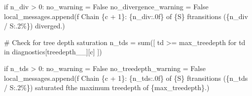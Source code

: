\documentclass[
  letterpaper,
  DIV=11,
  numbers=noendperiod]{scrartcl}
\newenvironment{Shaded}{\begin{snugshade}}{\end{snugshade}}
\newcommand{\BuiltInTok}[1]{\textcolor[rgb]{0.00,0.23,0.31}{#1}}
\newcommand{\CommentTok}[1]{\textcolor[rgb]{0.37,0.37,0.37}{#1}}
\newcommand{\ControlFlowTok}[1]{\textcolor[rgb]{0.00,0.23,0.31}{#1}}
\newcommand{\DecValTok}[1]{\textcolor[rgb]{0.68,0.00,0.00}{#1}}
\newcommand{\KeywordTok}[1]{\textcolor[rgb]{0.00,0.23,0.31}{#1}}
\newcommand{\NormalTok}[1]{\textcolor[rgb]{0.00,0.23,0.31}{#1}}
\newcommand{\OperatorTok}[1]{\textcolor[rgb]{0.37,0.37,0.37}{#1}}
\newcommand{\SpecialCharTok}[1]{\textcolor[rgb]{0.37,0.37,0.37}{#1}}
\newcommand{\SpecialStringTok}[1]{\textcolor[rgb]{0.13,0.47,0.30}{#1}}
\newcommand{\StringTok}[1]{\textcolor[rgb]{0.13,0.47,0.30}{#1}}
\newcommand{\VariableTok}[1]{\textcolor[rgb]{0.07,0.07,0.07}{#1}}
\begin{document}
\begin{Shaded}
\begin{Highlighting}[]
    \ControlFlowTok{if}\NormalTok{ n\_div }\OperatorTok{\textgreater{}} \DecValTok{0}\NormalTok{:}
\NormalTok{      no\_warning }\OperatorTok{=} \VariableTok{False}
\NormalTok{      no\_divergence\_warning }\OperatorTok{=} \VariableTok{False}
\NormalTok{      local\_messages.append(}\SpecialStringTok{f\textquotesingle{}  Chain }\SpecialCharTok{\{}\NormalTok{c }\OperatorTok{+} \DecValTok{1}\SpecialCharTok{\}}\SpecialStringTok{: }\SpecialCharTok{\{}\NormalTok{n\_div}\SpecialCharTok{:.0f\}}\SpecialStringTok{ of }\SpecialCharTok{\{}\NormalTok{S}\SpecialCharTok{\}}\SpecialStringTok{ \textquotesingle{}}
                            \SpecialStringTok{f\textquotesingle{}transitions (}\SpecialCharTok{\{}\NormalTok{n\_div }\OperatorTok{/}\NormalTok{ S}\SpecialCharTok{:.2\%\}}\SpecialStringTok{) diverged.\textquotesingle{}}\NormalTok{)}
    
    \CommentTok{\# Check for tree depth saturation}
\NormalTok{    n\_tds }\OperatorTok{=} \BuiltInTok{sum}\NormalTok{([ td }\OperatorTok{\textgreater{}=}\NormalTok{ max\_treedepth }
                  \ControlFlowTok{for}\NormalTok{ td }\KeywordTok{in}\NormalTok{ diagnostics[}\StringTok{\textquotesingle{}treedepth\_\_\textquotesingle{}}\NormalTok{][c] ])}
    
    \ControlFlowTok{if}\NormalTok{ n\_tds }\OperatorTok{\textgreater{}} \DecValTok{0}\NormalTok{:}
\NormalTok{      no\_warning }\OperatorTok{=} \VariableTok{False}
\NormalTok{      no\_treedepth\_warning }\OperatorTok{=} \VariableTok{False}
\NormalTok{      local\_messages.append(}\SpecialStringTok{f\textquotesingle{}  Chain }\SpecialCharTok{\{}\NormalTok{c }\OperatorTok{+} \DecValTok{1}\SpecialCharTok{\}}\SpecialStringTok{: }\SpecialCharTok{\{}\NormalTok{n\_tds}\SpecialCharTok{:.0f\}}\SpecialStringTok{ of }\SpecialCharTok{\{}\NormalTok{S}\SpecialCharTok{\}}\SpecialStringTok{ \textquotesingle{}}
                            \SpecialStringTok{f\textquotesingle{}transitions (}\SpecialCharTok{\{}\NormalTok{n\_tds }\OperatorTok{/}\NormalTok{ S}\SpecialCharTok{:.2\%\}}\SpecialStringTok{) saturated \textquotesingle{}}
                            \SpecialStringTok{f\textquotesingle{}the maximum treedepth of }\SpecialCharTok{\{}\NormalTok{max\_treedepth}\SpecialCharTok{\}}\SpecialStringTok{.\textquotesingle{}}\NormalTok{)}
    

\end{Highlighting}
\end{Shaded}
\end{document}
